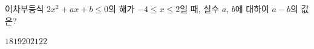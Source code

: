 \hspace*{2mm}\begin{minipage}[t]{\dimexpr\linewidth-2mm\relax}\vspace{0pt}
이차부등식 $2x^2+ax+b\le 0$의 해가 $-4\le x\le 2$일 때, 실수 $a$, $b$에 대하여 $a-b$의 값은?
\begin{choices32}{$18$}{$19$}{$20$}{$21$}{$22$}\end{choices32}\end{minipage}
